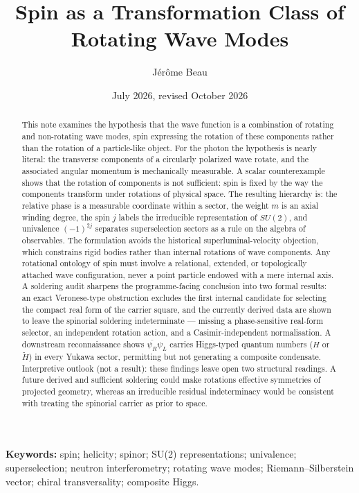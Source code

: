 \documentclass[11pt,a4paper]{article}
\title{Spin as a Transformation Class of Rotating Wave Modes}
\author{J\'er\^ome Beau}
\date{July 2026, revised October 2026}
\begin{document}
\maketitle

\begin{abstract}
This note examines the hypothesis that the wave function is a combination of rotating and non-rotating wave
modes, spin expressing the rotation of these components rather than the rotation of a particle-like object.
For the photon the hypothesis is nearly literal: the transverse components of a circularly polarized wave
rotate, and the associated angular momentum is mechanically measurable.
A scalar counterexample shows that the rotation of components is not sufficient: spin is fixed by the way
the components transform under rotations of physical space.
The resulting hierarchy is: the relative phase is a measurable coordinate within a sector, the weight $m$ is
an axial winding degree, the spin $j$ labels the irreducible representation of $SU(2)$, and univalence
$(-1)^{2j}$ separates superselection sectors as a rule on the algebra of observables.
The formulation avoids the historical superluminal-velocity objection, which constrains rigid bodies rather
than internal rotations of wave components.
Any rotational ontology of spin must involve a relational, extended, or topologically attached wave
configuration, never a point particle endowed with a mere internal axis.
A soldering audit sharpens the programme-facing conclusion into two formal results: an exact
Veronese-type obstruction excludes the first internal candidate for selecting the compact real form of
the carrier square, and the currently derived data are shown to leave the spinorial soldering
indeterminate — missing a phase-sensitive real-form selector, an independent rotation action, and a
Casimir-independent normalisation.
A downstream reconnaissance shows $\overline{\psi_R}\psi_L$ carries Higgs-typed quantum numbers
($H$ or $\widetilde{H}$) in every Yukawa sector, permitting but not generating a composite condensate.
Interpretive outlook (not a result): these findings leave open two structural readings.
A future derived and sufficient soldering could make rotations effective symmetries of projected
geometry, whereas an irreducible residual indeterminacy would be consistent with treating the spinorial
carrier as prior to space.
\end{abstract}

\vspace{1em}
\begin{sloppypar}
\noindent\textbf{Keywords:} spin; helicity; spinor; SU(2) representations; univalence; superselection;
neutron interferometry; rotating wave modes; Riemann--Silberstein vector; chiral transversality;
composite Higgs.
\end{sloppypar}
\end{document}
